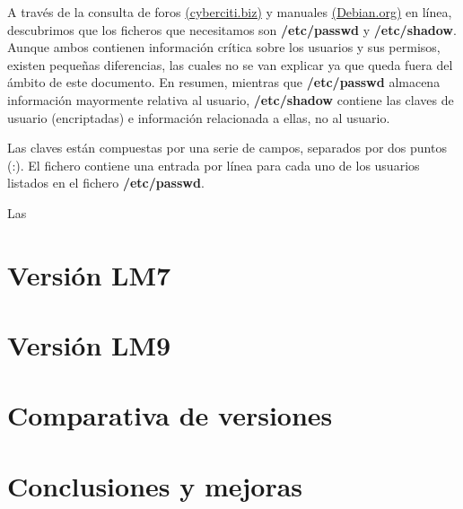 A través de la consulta de foros
 \href{https://www.cyberciti.biz/faq/where-are-the-passwords-of-the-users-located-in-linux/}{(cyberciti.biz)} y manuales \href{https://www.debian.org/doc/manuals/system-administrator/ch-sysadmin-users.html}{(Debian.org)} en línea, descubrimos que los ficheros que necesitamos son \textbf{/etc/passwd} y \textbf{/etc/shadow}. Aunque ambos contienen información crítica sobre los usuarios y sus permisos, existen pequeñas diferencias, las cuales no se van explicar ya que queda fuera del ámbito de este documento. En resumen, mientras que \textbf{/etc/passwd} almacena información mayormente relativa al usuario, \textbf{/etc/shadow} contiene las claves de usuario (encriptadas) e información relacionada a ellas, no al usuario.


 Las claves están compuestas por una serie de campos, separados por dos puntos (:). El fichero contiene una entrada por línea para cada uno de los usuarios listados en el fichero \textbf{/etc/passwd}.

Las

\section{Versión LM7}   \label{sec:lms7}

\section{Versión LM9}   \label{sec:lms9}

\section{Comparativa de versiones}  \label{sec:lms7-9}

\section{Conclusiones y mejoras}    \label{sec:ii-conclusiones}

